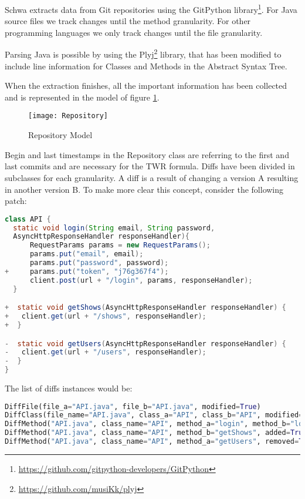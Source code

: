 Schwa extracts data from Git repositories using the GitPython
library\footnote{\url{https://github.com/gitpython-developers/GitPython}}. For
Java source files we track changes until the method granularity. For other
programming languages we only track changes until the file granularity.

Parsing Java is possible by using the
Plyj\footnote{\url{https://github.com/musiKk/plyj}} library, that has been
modified to include line information for Classes and Methods in the Abstract
Syntax Tree.

When the extraction finishes, all the important information has been collected
and is represented in the model of figure \ref{figure:repository_model}.

\begin{figure}[H]
    \begin{center}
        \texttt{[image: Repository]}
        \caption{Repository Model}
        \label{figure:repository_model}
    \end{center}
\end{figure}

Begin and last timestamps in the Repository class are referring to the first and
last commits and are necessary for the TWR formula. Diffs have been divided in
subclasses for each granularity. A diff is a result of changing a version A
resulting in another version B. To make more clear this concept, consider the
following patch:

\begin{lstlisting}[language=java, caption=Patch in API.java]
class API {
  static void login(String email, String password,
  AsyncHttpResponseHandler responseHandler){
      RequestParams params = new RequestParams();
      params.put("email", email);
      params.put("password", password);
+     params.put("token", "j76g367f4");
      client.post(url + "/login", params, responseHandler);
  }

+  static void getShows(AsyncHttpResponseHandler responseHandler) {
+   client.get(url + "/shows", responseHandler);
+  }

-  static void getUsers(AsyncHttpResponseHandler responseHandler) {
-   client.get(url + "/users", responseHandler);
-  }
}
\end{lstlisting}


The list of diffs instances would be:

\begin{lstlisting}[language=python, caption=List of Diff instances]
DiffFile(file_a="API.java", file_b="API.java", modified=True)
DiffClass(file_name="API.java", class_a="API", class_b="API", modified=True)
DiffMethod("API.java", class_name="API", method_a="login", method_b="login", modified=True)
DiffMethod("API.java", class_name="API", method_b="getShows", added=True)
DiffMethod("API.java", class_name="API", method_a="getUsers", removed=True)
\end{lstlisting}

